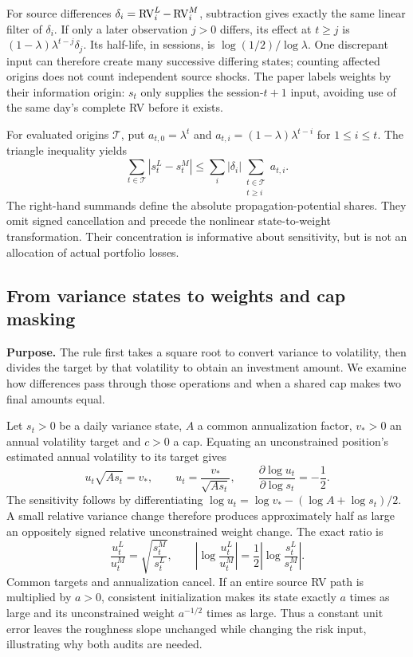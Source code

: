 For source differences $\delta_i=\operatorname{RV}_i^L-\operatorname{RV}_i^M$, subtraction gives exactly the same linear filter of $\delta_i$. If only a later observation $j>0$ differs, its effect at $t\geq j$ is $(1-\lambda)\lambda^{t-j}\delta_j$. Its half-life, in sessions, is $\log(1/2)/\log\lambda$. One discrepant input can therefore create many successive differing states; counting affected origins does not count independent source shocks. The paper labels weights by their information origin: $s_t$ only supplies the session-$t+1$ input, avoiding use of the same day's complete RV before it exists.

For evaluated origins $\mathcal T$, put $a_{t,0}=\lambda^t$ and $a_{t,i}=(1-\lambda)\lambda^{t-i}$ for $1\leq i\leq t$. The triangle inequality yields
\begin{equation}
 \sum_{t\in\mathcal T}|s_t^L-s_t^M|
 \leq\sum_i |\delta_i|\sum_{\substack{t\in\mathcal T\\t\geq i}}a_{t,i}.\label{eq:potential}
\end{equation}
The right-hand summands define the absolute propagation-potential shares. They omit signed cancellation and precede the nonlinear state-to-weight transformation. Their concentration is informative about sensitivity, but is not an allocation of actual portfolio losses.

\subsection{From variance states to weights and cap masking}\label{app:weights}
\textbf{Purpose.} The rule first takes a square root to convert variance to volatility, then divides the target by that volatility to obtain an investment amount. We examine how differences pass through those operations and when a shared cap makes two final amounts equal.

Let $s_t>0$ be a daily variance state, $A$ a common annualization factor, $v_*>0$ an annual volatility target and $c>0$ a cap. Equating an unconstrained position's estimated annual volatility to its target gives
\begin{equation}
 u_t\sqrt{A s_t}=v_*,\qquad
 u_t=\frac{v_*}{\sqrt{A s_t}},\qquad
 \frac{\partial\log u_t}{\partial\log s_t}=-\frac12.
\end{equation}
The sensitivity follows by differentiating $\log u_t=\log v_*-(\log A+\log s_t)/2$. A small relative variance change therefore produces approximately half as large an oppositely signed relative unconstrained weight change. The exact ratio is
\begin{equation}
 \frac{u_t^L}{u_t^M}=\sqrt{\frac{s_t^M}{s_t^L}},\qquad
 \left|\log\frac{u_t^L}{u_t^M}\right|
 =\frac12\left|\log\frac{s_t^L}{s_t^M}\right|.\label{eq:stateratio}
\end{equation}
Common targets and annualization cancel. If an entire source RV path is multiplied by $a>0$, consistent initialization makes its state exactly $a$ times as large and its unconstrained weight $a^{-1/2}$ times as large. Thus a constant unit error leaves the roughness slope unchanged while changing the risk input, illustrating why both audits are needed.

